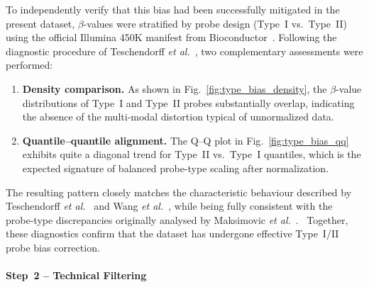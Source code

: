 \documentclass[10pt]{extarticle}
\newcommand{\good}[1]{\textcolor{teal!70!black}{\ding{51}~#1}}
\begin{document}
To independently verify that this bias had been successfully mitigated in the present dataset, $\beta$-values were
stratified by probe design (Type~I vs.~Type~II) using the official Illumina 450K manifest
from Bioconductor~\cite{Illumina450kAnno}.  
Following the diagnostic procedure of Teschendorff \textit{et al.}~\cite{Teschendorff2013BMIQ}, two complementary
assessments were performed:

\begin{enumerate}
    \item \textbf{Density comparison.}  
    As shown in Fig.~\ref{fig:type_bias_density}, the $\beta$-value distributions of Type~I and Type~II probes
    substantially overlap, indicating the absence of the multi-modal distortion typical of unnormalized data.
    \item \textbf{Quantile--quantile alignment.}  
    The Q--Q plot in Fig.~\ref{fig:type_bias_qq} exhibits quite a diagonal trend for Type~II vs.~Type~I
    quantiles, which is the expected signature of balanced probe-type scaling after normalization.
\end{enumerate}

The resulting pattern closely matches the characteristic behaviour described by Teschendorff
\textit{et al.}~\cite{Teschendorff2013BMIQ} and Wang \textit{et al.}~\cite{Wang2015Normalization450K}, while being fully
consistent with the probe-type discrepancies originally analysed by Maksimovic \textit{et al.}~\cite{Maksimovic2012}.  
\good{Together, these diagnostics confirm that the dataset has undergone effective Type~I/II probe bias correction.}



\paragraph{Step~2 -- Technical Filtering}
\label{par:gse69914_step2}
\end{document}
